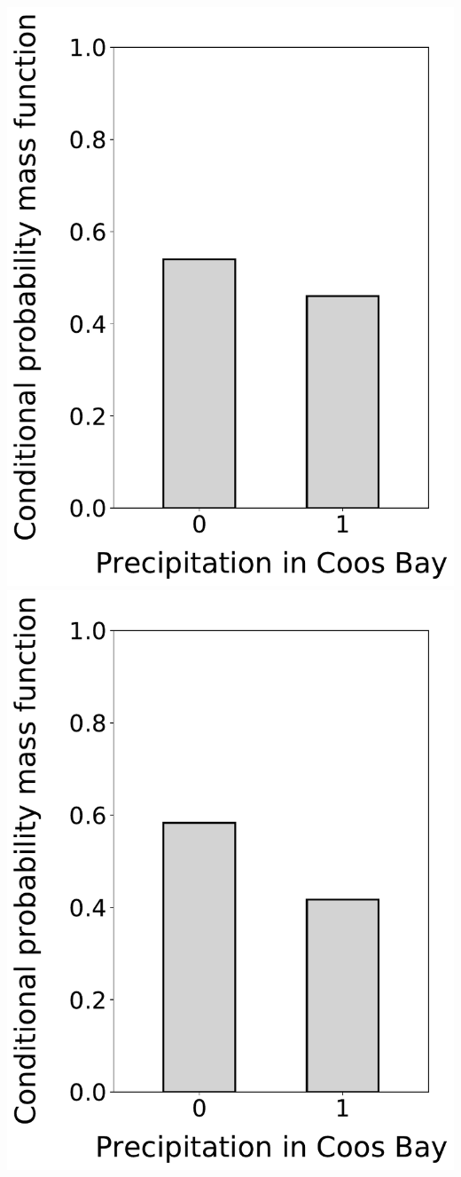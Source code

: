 \documentclass[12pt,twoside]{article}
\begin{document}
\begin{enumerate}
\includegraphics[scale=.5]{precipitation_cond_pmf_2_given_1eq1_3eq0.pdf}
\includegraphics[scale=.5]{precipitation_cond_pmf_2_given_1eq1_3eq1.pdf}

\end{enumerate}
\end{document}
